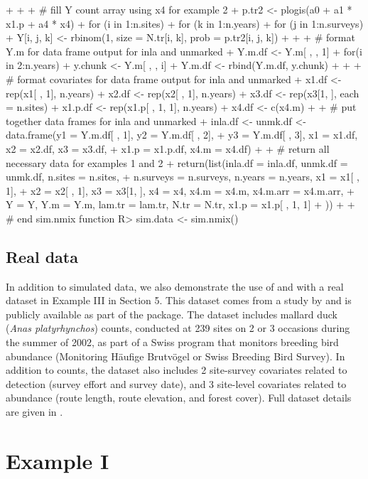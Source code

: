 \documentclass[codesnippet]{jss}
\begin{document}
\begin{CodeInput}
{{{{+    }}}
+
+    # fill Y count array using x4 for example 2
+    p.tr2 <- plogis(a0 + a1 * x1.p + a4 * x4)
+    for (i in 1:n.sites){
+      for (k in 1:n.years){
+        for (j in 1:n.surveys){
+          Y[i, j, k] <- rbinom(1, size = N.tr[i, k], prob = p.tr2[i, j, k])
+    }}}
+
+    # format Y.m for data frame output for inla and unmarked
+    Y.m.df <- Y.m[ , , 1]
+    for(i in 2:n.years){
+      y.chunk <- Y.m[ , , i]
+      Y.m.df <- rbind(Y.m.df, y.chunk)
+    }
+
+    # format covariates for data frame output for inla and unmarked
+    x1.df <- rep(x1[ , 1], n.years)
+    x2.df <- rep(x2[ , 1], n.years)
+    x3.df <- rep(x3[1, ], each = n.sites)
+    x1.p.df <- rep(x1.p[ , 1, 1], n.years)
+    x4.df <- c(x4.m)
+
+    # put together data frames for inla and unmarked
+    inla.df <- unmk.df <- data.frame(y1 = Y.m.df[ , 1], y2 = Y.m.df[ , 2],
+    y3 = Y.m.df[ , 3], x1 = x1.df, x2 = x2.df, x3 = x3.df,
+    x1.p = x1.p.df, x4.m = x4.df)
+
+    # return all necessary data for examples 1 and 2
+    return(list(inla.df = inla.df, unmk.df = unmk.df, n.sites = n.sites,
+      n.surveys = n.surveys, n.years = n.years, x1 = x1[ , 1],
+      x2 = x2[ , 1], x3 = x3[1, ], x4 = x4, x4.m = x4.m, x4.m.arr = x4.m.arr,
+      Y = Y, Y.m = Y.m, lam.tr = lam.tr, N.tr = N.tr, x1.p = x1.p[ , 1, 1]
+    ))
+
+  } # end sim.nmix function
R> sim.data <- sim.nmix()
\end{CodeInput}

\subsection[Real data]{Real data}
In addition to simulated data, we also demonstrate the use of  and  with a real dataset in Example III in Section 5. This dataset comes from a study by \cite{Kery_Royle_Schmid_2005} and is publicly available as part of the  package. The dataset includes mallard duck (\emph{Anas platyrhynchos}) counts, conducted at 239 sites on 2 or 3 occasions during the summer of 2002, as part of a Swiss program that monitors breeding bird abundance (Monitoring H\"{a}ufige Brutv\"{o}gel or Swiss Breeding Bird Survey). In addition to counts, the dataset also includes 2 site-survey covariates related to detection (survey effort and survey date), and 3 site-level covariates related to abundance (route length, route elevation, and forest cover). Full dataset details are given in \cite{Kery_Royle_Schmid_2005}.

\section[Example I]{Example I}
\end{document}
